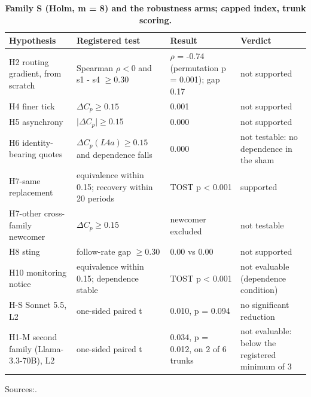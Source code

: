\documentclass[11pt,a4paper]{article}
\newif\ifclaimtags
\newcommand{\claim}[1]{\ifclaimtags\textsuperscript{[#1]}\fi}
\begin{document}
%
\begin{table}[htbp]
\centering
\renewcommand{\thetable}{C1}
\caption{\textbf{Family S (Holm, m = 8) and the robustness arms; capped index, trunk scoring.} }
\label{tab:C1}
\footnotesize
\setlength{\tabcolsep}{3pt}
%
\begin{tabularx}{\linewidth}{@{}LLLL@{}}
\toprule
Hypothesis & Registered test & Result & Verdict \\
\midrule
H2 routing gradient, from scratch & Spearman $\rho < 0$ and s1 - s4 $\ge 0.30$ & $\rho$ = -0.74 (permutation p = 0.001); gap 0.17 & not supported \\
H4 finer tick & $\Delta C_p \ge 0.15$ & 0.001 & not supported \\
H5 asynchrony & $\lvert \Delta C_p \rvert \ge 0.15$ & 0.000 & not supported \\
H6 identity-bearing quotes & $\Delta C_p(L4a) \ge 0.15$ and dependence falls & 0.000 & not testable: no dependence in the sham \\
H7-same replacement & equivalence within 0.15; recovery within 20 periods & TOST p < 0.001 & supported \\
H7-other cross-family newcomer & $\Delta C_p \ge 0.15$ & newcomer excluded & not testable \\
H8 sting & follow-rate gap $\ge 0.30$ & 0.00 vs 0.00 & not supported \\
H10 monitoring notice & equivalence within 0.15; dependence stable & TOST p < 0.001 & not evaluable (dependence condition) \\
H-S Sonnet 5.5, L2 & one-sided paired t & 0.010, p = 0.094 & no significant reduction \\
H1-M second family (Llama-3.3-70B), L2 & one-sided paired t & 0.034, p = 0.012, on 2 of 6 trunks & not evaluable: below the registered minimum of 3 \\
\bottomrule
\end{tabularx}
\end{table}

Sources:\claim{C2}\claim{C5}\claim{C7}\claim{C-S}.
\end{document}
